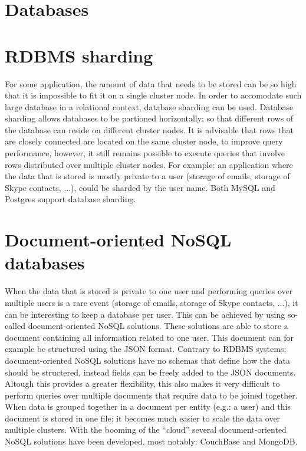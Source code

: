 \documentclass[12pt]{report}
\begin{document}
\section{Databases}
\section{RDBMS sharding}
For some application, the amount of data that needs to be stored can be so high
that it is impossible to fit it on a single cluster node. In order to
accomodate such large database in a relational context, database
sharding can be used. Database sharding allows databases to be
partioned horizontally; so that different rows of the database can
reside on different cluster nodes. It is advisable that rows that are
closely connected are located on the same cluster node, to improve
query performance, however, it still remains possible to execute
queries that involve rows distributed over multiple cluster nodes.
For example: an application where the data that is stored is mostly 
private to a user (storage of emails, storage of Skype contacts, ...),
 could be sharded by the user name.
Both MySQL \cite{mysql_db:2013} and Postgres \cite{postgres_db:2013}
support database sharding.
\section{Document-oriented NoSQL databases}
When the data that is stored is private to one user and performing
queries over multiple users is a rare event (storage of emails,
storage of Skype contacts, ...), it can be interesting to keep a
database per user. This can be achieved by using so-called
document-oriented NoSQL solutions. 
These solutions are able to store a document
containing all information related to one user. This document can for
example be structured using the JSON format. Contrary to RDBMS
systems; document-oriented NoSQL solutions have no schemas that define
how the data should be structered, instead fields can be freely added
to the JSON documents.
Altough this provides a greater flexibility, this also makes it very
difficult to perform queries over multiple documents that require data
to be joined together.
When data is grouped together in a document per entity (e.g.: a user)
and this document is stored in one file; it becomes much easier to scale the data over
multiple clusters.
With the booming of the ``cloud'' several document-oriented NoSQL
solutions have been developed, most notably: CouchBase and MongoDB.
\end{document}
